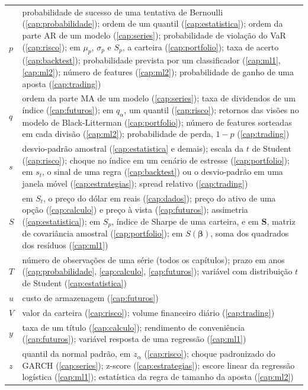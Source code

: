 \begin{longtable}{>{\raggedright\arraybackslash}p{12mm} >{\raggedright\arraybackslash}p{97mm}}
$p$ & probabilidade de sucesso de uma tentativa de Bernoulli (\ref{cap:probabilidade}); ordem de um quantil (\ref{cap:estatistica}); ordem da parte AR de um modelo (\ref{cap:series}); probabilidade de violação do VaR (\ref{cap:risco}); em $\mu_p$, $\sigma_p$ e $S_p$, a carteira (\ref{cap:portfolio}); taxa de acerto (\ref{cap:backtest}); probabilidade prevista por um classificador (\ref{cap:ml1}, \ref{cap:ml2}); número de features (\ref{cap:ml2}); probabilidade de ganho de uma aposta (\ref{cap:trading}) \\
$q$ & ordem da parte MA de um modelo (\ref{cap:series}); taxa de dividendos de um índice (\ref{cap:futuros}); em $q_\alpha$, um quantil (\ref{cap:risco}); retornos das visões no modelo de Black-Litterman (\ref{cap:portfolio}); número de features sorteadas em cada divisão (\ref{cap:ml2}); probabilidade de perda, $1 - p$ (\ref{cap:trading}) \\
$s$ & desvio-padrão amostral (\ref{cap:estatistica} e demais); escala da $t$ de Student (\ref{cap:risco}); choque no índice em um cenário de estresse (\ref{cap:portfolio}); em $s_t$, o sinal de uma regra (\ref{cap:backtest}) ou o desvio-padrão em uma janela móvel (\ref{cap:estrategias}); spread relativo (\ref{cap:trading}) \\
$S$ & em $S_t$, o preço do dólar em reais (\ref{cap:dados}); preço do ativo de uma opção (\ref{cap:calculo}) e preço à vista (\ref{cap:futuros}); assimetria (\ref{cap:estatistica}); em $S_p$, índice de Sharpe de uma carteira, e em $\symbf{S}$, matriz de covariância amostral (\ref{cap:portfolio}); em $S(\symbf{\beta})$, soma dos quadrados dos resíduos (\ref{cap:ml1}) \\
$T$ & número de observações de uma série (todos os capítulos); prazo em anos (\ref{cap:probabilidade}, \ref{cap:calculo}, \ref{cap:futuros}); variável com distribuição $t$ de Student (\ref{cap:estatistica}) \\
$u$ & custo de armazenagem (\ref{cap:futuros}) \\
$V$ & valor da carteira (\ref{cap:risco}); volume financeiro diário (\ref{cap:trading}) \\
$y$ & taxa de um título (\ref{cap:calculo}); rendimento de conveniência (\ref{cap:futuros}); variável resposta de uma regressão (\ref{cap:ml1}) \\
$z$ & quantil da normal padrão, em $z_\alpha$ (\ref{cap:risco}); choque padronizado do GARCH (\ref{cap:series}); z-score (\ref{cap:estrategias}); escore linear da regressão logística (\ref{cap:ml1}); estatística da regra de tamanho da aposta (\ref{cap:ml2}) \\
\end{longtable}
\endgroup

